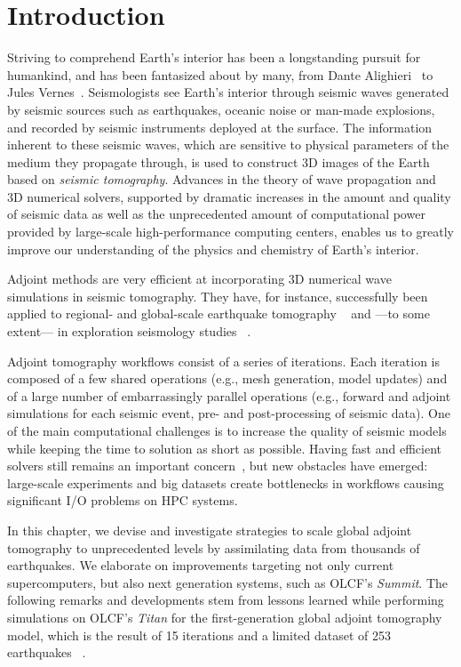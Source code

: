\section{Introduction}\label{sec:intro}

Striving to comprehend Earth's interior has been a longstanding pursuit for
humankind, and has been fantasized about by many, from Dante Alighieri~\cite{Dante1320}
to Jules Vernes~\cite{Vernes1864}.
Seismologists see Earth's interior through seismic waves generated by seismic
sources such as earthquakes, oceanic noise or man-made explosions, and
recorded by seismic instruments deployed at the surface.
The information inherent to these seismic waves, which are sensitive
to physical parameters of the medium they propagate through, is used to construct
3D images of the Earth based on \emph{seismic tomography}.
Advances in the theory of wave propagation and 3D numerical solvers, supported by
dramatic increases in the amount and quality of seismic data as well as
the unprecedented amount of computational power provided by large-scale high-performance
computing centers, enables us to greatly improve our understanding of the
physics and chemistry of Earth's interior.

Adjoint methods are very efficient at 
incorporating 3D numerical wave simulations in seismic tomography.
They have, for instance, successfully been
applied to regional- and global-scale earthquake tomography
~\cite{tape2009adjoint, Fichtner09,
zhu2012structure, bozdaug2016global} and ---to some extent--- in exploration seismology studies
~\cite{Zhu2009, Luo2013}.

Adjoint tomography workflows consist of a series of iterations. Each iteration is
composed of a few shared operations (e.g., mesh generation, model updates) and
of a large number of embarrassingly parallel operations (e.g., forward and
adjoint simulations for each seismic event, pre- and post-processing of seismic
data).
One of the main computational challenges is to increase the quality of seismic
models while keeping the time to solution as short as possible. Having fast and
efficient solvers still remains an important concern~\cite{Rietmann2012}, but
new obstacles have emerged: large-scale experiments and big datasets create
bottlenecks in workflows causing significant I/O problems on HPC systems.

In this chapter, we devise and investigate strategies to scale global
adjoint tomography to unprecedented levels by assimilating data from thousands
of earthquakes. We elaborate on improvements targeting not only current
supercomputers, but also next generation systems, such as OLCF's \emph{Summit}. The
following remarks and developments stem from lessons learned while performing
simulations on OLCF's \emph{Titan} for the first-generation global adjoint tomography 
model, which is the result of 15 iterations and a limited dataset of 253 earthquakes
~\cite{bozdaug2016global}.

